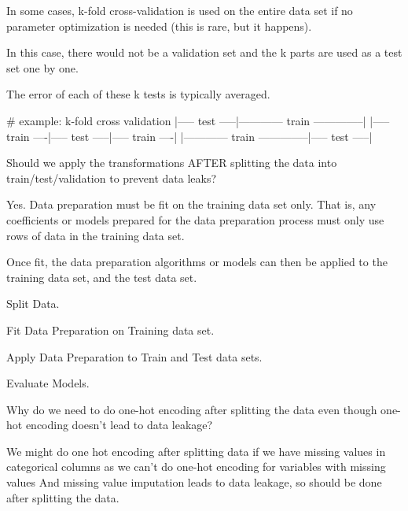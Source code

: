 \begin{qanda}
\begin{answer}
\begin{bulletedlist}
	\item In some cases, k-fold cross-validation is used on the entire data set if no parameter optimization is needed (this is rare, but it happens).
	\item In this case, there would not be a validation set and the k parts are used as a test set one by one.
	\item The error of each of these k tests is typically averaged.
\end{bulletedlist}
		\begin{code}[\codenumbering]{}
			\codeitemnonumber \# example: k-fold cross validation
			\codeitemnonumber
			\codeitemnonumber |----- test -----|------------ train --------------|
			\codeitemnonumber |----- train ----|----- test -----|----- train ----|
			\codeitemnonumber |------------ train --------------|----- test -----|
		\end{code}
		\end{answer}
	\end{qanda}

	\begin{qanda}
		\begin{question}
Should we apply the transformations AFTER splitting the data into train/test/validation to prevent data leaks?
		\end{question}

		\begin{answer}Yes. Data preparation must be fit on the training data set only. That is, any coefficients or models prepared for the data preparation process must only use rows of data in the training data set.

Once fit, the data preparation algorithms or models can then be applied to the training data set, and the test data set.
			\begin{numberedlist}
				\item Split Data.
				\item Fit Data Preparation on Training data set.
				\item Apply Data Preparation to Train and Test data sets.
				\item Evaluate Models.\end{numberedlist}\end{answer}\end{qanda}


	\begin{qanda}
		\begin{question}
Why do we need to do one-hot encoding after splitting the data even though one-hot encoding doesn't lead to data leakage?
		\end{question}

		\begin{answer}
We might do one hot encoding after splitting data if we have missing values in categorical columns as we can't do one-hot encoding for variables with missing values
And missing value imputation leads to data leakage, so should be done after splitting the data.
		\end{answer}
	\end{qanda}

